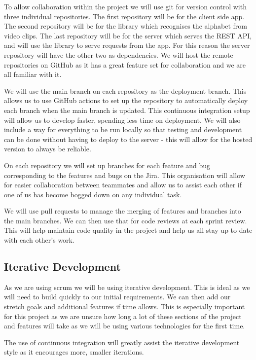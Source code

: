 \documentclass[10pt]{article}
\begin{document}
To allow collaboration within the project we will use git for version control with three individual 
repositories. The first repository will be for the client side app. The second repository will be 
for the library which recognises the alphabet from video clips. The last repository will be for the 
server which serves the REST API, and will use the library to serve requests from the app. For this 
reason the server repository will have the other two as dependencies. We will host the remote 
repositories on GitHub as it has a great feature set for collaboration and we are all familiar with 
it.

We will use the main branch on each repository as the deployment branch. This allows us to use 
GitHub actions to set up the repository to automatically deploy each branch when the main branch is 
updated. This continuous integration setup will allow us to develop faster, spending less time on 
deployment. We will also include a way for everything to be run locally so that testing and 
development can be done without having to deploy to the server - this will allow for the hosted 
version to always be reliable.

On each repository we will set up branches for each feature and bug corresponding to the features 
and bugs on the Jira. This organisation will allow for easier collaboration between teammates and 
allow us to assist each other if one of us has become bogged down on any individual task.

We will use pull requests to manage the merging of features and branches into the main branches. We 
can then use that for code reviews at each sprint review. This will help maintain code quality in 
the project and help us all stay up to date with each other's work.

\subsection{Iterative Development}

As we are using scrum we will be using iterative development. This is ideal as we will need to build 
quickly to our initial requirements. We can then add our stretch goals and additional features if 
time allows. This is especially important for this project as we are unsure how long a lot of these 
sections of the project and features will take as we will be using various technologies for the 
first time. 

The use of continuous integration will greatly assist the iterative development style as it 
encourages more, smaller iterations.
\end{document}
